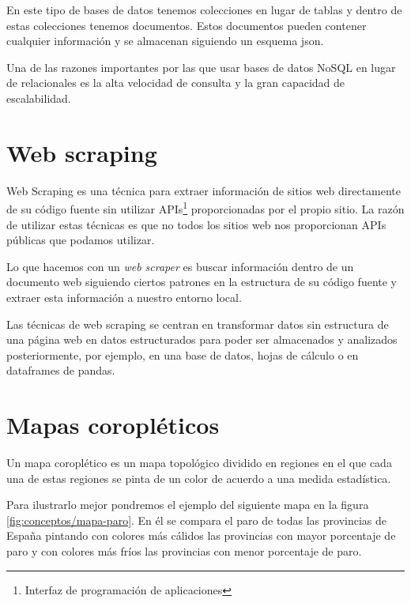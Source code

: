 En este tipo de bases de datos tenemos colecciones en lugar de tablas y dentro de estas colecciones tenemos documentos. Estos documentos pueden contener cualquier información y se almacenan siguiendo un esquema json.

Una de las razones importantes por las que usar bases de datos NoSQL en lugar de relacionales es la alta velocidad de consulta y la gran capacidad de escalabilidad.


\section{Web scraping} \label{webscraping}

Web Scraping \cite{wiki:webscraping} es una técnica para extraer información de sitios web directamente de su código fuente sin utilizar APIs\footnote{Interfaz de programación de aplicaciones} proporcionadas por el propio sitio. La razón de utilizar estas técnicas es que no todos los sitios web nos proporcionan APIs públicas que podamos utilizar.

Lo que hacemos con un \textit{web scraper} es buscar información dentro de un documento web siguiendo ciertos patrones en la estructura de su código fuente y extraer esta información a nuestro entorno local.

Las técnicas de web scraping se centran en transformar datos sin estructura de una página web en datos estructurados para poder ser almacenados y analizados posteriormente, por ejemplo, en una base de datos, hojas de cálculo o en dataframes de pandas.


\section{Mapas coropléticos} \label{mapascoropleticos}

Un mapa coroplético \cite{wiki:mapascoropleticos} es un mapa topológico dividido en regiones en el que cada una de estas regiones se pinta de un color de acuerdo a una medida estadística.

Para ilustrarlo mejor pondremos el ejemplo del siguiente mapa en la figura \ref{fig:conceptos/mapa-paro}. En él se compara el paro de todas las provincias de España pintando con colores más cálidos las provincias con mayor porcentaje de paro y con colores más fríos las provincias con menor porcentaje de paro.



